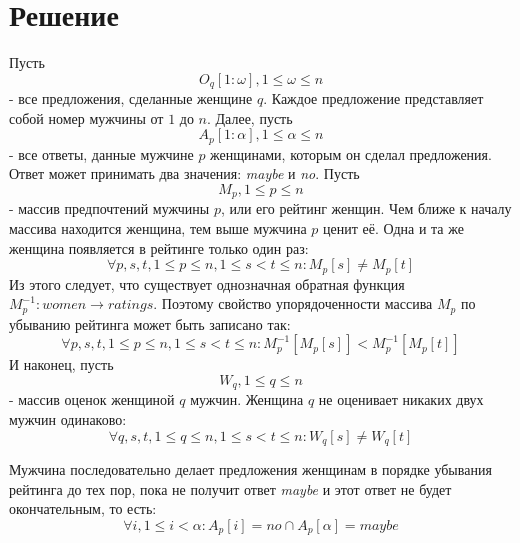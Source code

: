\documentclass{article}
\author{Виталий Кирсанов}
\begin{document}
\small

\section{Решение}

Пусть 
\begin{displaymath}
O_q[1:\omega], 1 \leq \omega \leq n 
\end{displaymath}
- все предложения, сделанные женщине \( q \). Каждое предложение представляет собой номер мужчины от \( 1 \) до \( n \). Далее, пусть
\begin{displaymath}
A_p[1:\alpha], 1 \leq \alpha \leq n 
\end{displaymath}
- все ответы, данные мужчине \( p \) женщинами, которым он сделал предложения. Ответ может принимать два значения: \emph{maybe} и \emph{no}.
Пусть
\begin{displaymath}
M_p, 1 \leq p \leq n
\end{displaymath}
- массив предпочтений мужчины \( p \), или его рейтинг женщин. Чем ближе к началу массива находится женщина, тем выше мужчина \( p \) ценит её. Одна
и та же женщина появляется в рейтинге только один раз:
\begin{displaymath}
\forall p,s,t, 1 \leq p \leq n, 1 \leq s < t \leq n : M_p[s] \neq M_p[t]
\end{displaymath}
Из этого следует, что существует однозначная обратная функция \( M_p^{-1} : women \to ratings \). Поэтому свойство упорядоченности массива \( M_p \) по
убыванию рейтинга может быть записано так:
\begin{displaymath}
\forall p,s,t, 1 \leq p \leq n, 1 \leq s < t \leq n : M_p^{-1}[M_p[s]] < M_p^{-1}[M_p[t]]
\end{displaymath}
И наконец, пусть
\begin{displaymath}
W_q, 1 \leq q \leq n
\end{displaymath}
- массив оценок женщиной \( q \) мужчин. Женщина \( q \) не оценивает никаких двух мужчин одинаково:
\begin{displaymath}
\forall q,s,t, 1 \leq q \leq n, 1 \leq s < t \leq n : W_q[s] \neq W_q[t]
\end{displaymath}

Мужчина последовательно делает предложения женщинам в порядке убывания рейтинга до тех пор, пока не получит ответ \emph{maybe} и этот ответ не
будет окончательным, то есть:
\begin{displaymath}
\forall i, 1 \leq i < \alpha : A_p[i] = no \cap A_p[\alpha] = maybe
\end{displaymath}
\end{document}
